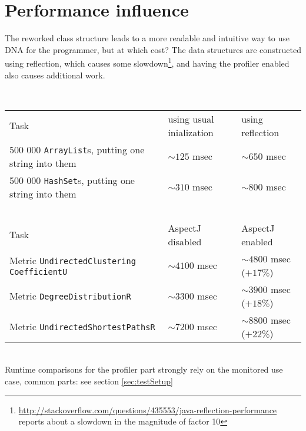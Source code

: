 \section{Performance influence}
	The reworked class structure leads to a more readable and intuitive way to use DNA for
	the programmer, but at which cost? The data structures are constructed using reflection,
	which causes some
	slowdown\footnote{\url{http://stackoverflow.com/questions/435553/java-reflection-performance}
	reports about a slowdown in the magnitude of factor 10}, and having the profiler
	enabled also causes additional work. 
	
	\ \\ 	
	\begin{center}
		\begin{tabular}{lll}
			Task & using usual inialization & using reflection \\
		    500 000 \texttt{ArrayList}s, putting one string into them & 
		    	$\sim 125$ msec & $\sim 650$ msec   \\
		    500 000 \texttt{HashSet}s, putting one string into them  &
		    	$\sim 310$ msec & $\sim 800$ msec \\
			~ & ~ & \\
			Task & AspectJ disabled & AspectJ enabled \\
	    	Metric \texttt{Undirected\allowbreak Clustering\allowbreak
				CoefficientU} & $\sim 4100$ msec & $\sim 4800$ msec ($+ 17\%$) \\
			Metric \texttt{Degree\allowbreak DistributionR} &
				$\sim 3300$ msec & $\sim 3900$ msec ($+ 18\%$) \\
			Metric \texttt{Undirected\allowbreak Shortest\allowbreak PathsR} &
				$\sim 7200$ msec & $\sim 8800$ msec ($+ 22\%$) \\
	    \end{tabular}
	\end{center}
	    
	\ \\
	Runtime comparisons for the profiler part strongly rely on the monitored use
	case, common parts: see section \ref{sec:testSetup}
